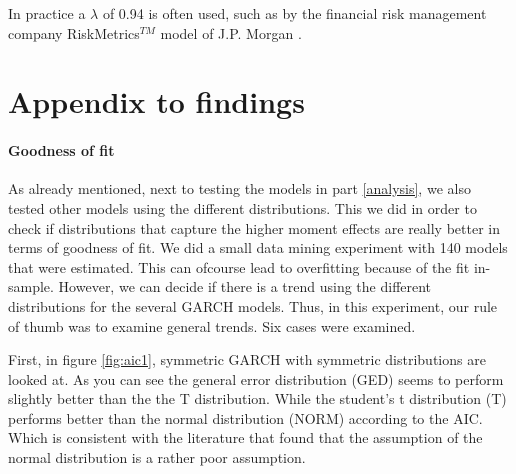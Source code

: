 \documentclass[a4paper, nobind]{templates/ociamthesis}
\begin{document}
In practice a \(\lambda\) of 0.94 is often used, such as by the financial risk management company RiskMetrics\(^{TM}\) model of J.P. Morgan \autocite{morganguarantytrustcompany1996}.

\newpage

\hypertarget{appendix-to-findings}{%
\chapter{Appendix to findings}\label{appendix-to-findings}}

\hypertarget{goodness-of-fit}{%
\subsubsection{Goodness of fit}\label{goodness-of-fit}}

\noindent As already mentioned, next to testing the models in part \ref{analysis}, we also tested other models using the different distributions. This we did in order to check if distributions that capture the higher moment effects are really better in terms of goodness of fit. We did a small data mining experiment with 140 models that were estimated. This can ofcourse lead to overfitting because of the fit in-sample. However, we can decide if there is a trend using the different distributions for the several GARCH models. Thus, in this experiment, our rule of thumb was to examine general trends. Six cases were examined. ~\\

\newpage

First, in figure \ref{fig:aic1}, symmetric GARCH with symmetric distributions are looked at. As you can see the general error distribution (GED) seems to perform slightly better than the the T distribution. While the student's t distribution (T) performs better than the normal distribution (NORM) according to the AIC. Which is consistent with the literature that found that the assumption of the normal distribution is a rather poor assumption.
\end{document}
